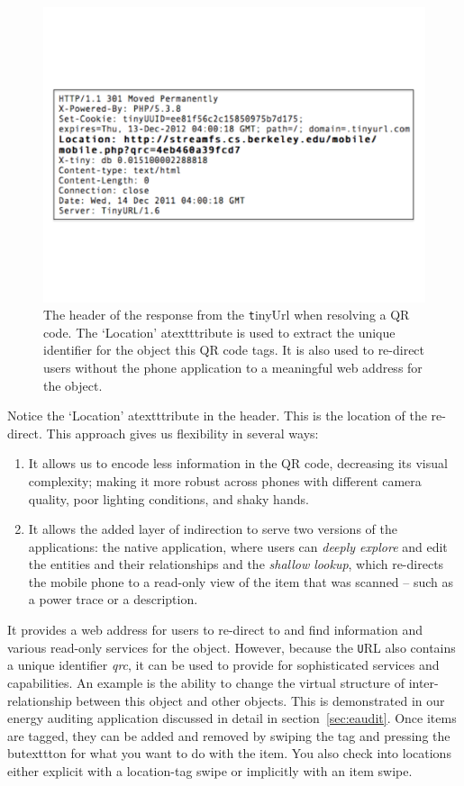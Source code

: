 \begin{figure}[htb!]
\begin{center}
\includegraphics[scale=0.30]{figs/tinyurlhdr}
\caption{The header of the response from the {\texttt tinyUrl} when resolving a QR code.  The `Location' atextttribute
is used to extract the unique identifier for the object this QR code tags.  It is also used to re-direct
users without the phone application to a meaningful web address for the object.}
\label{fig:tinyurlhdr}
\end{center}
\end{figure}


Notice the `Location' atextttribute in the header.  This is the location of the re-direct.  This approach gives us
flexibility in several ways:

\begin{enumerate}
\item It allows us to encode less information in the QR code, decreasing its visual complexity; making it more
		robust across phones with different camera quality, poor lighting conditions, and shaky hands.
\item It allows the added layer of indirection to serve two versions of the applications:  the native application,
		where users can \emph{deeply explore} and edit the entities and their relationships and the \emph{shallow lookup}, 
		which re-directs the mobile phone to a read-only view of the item that was scanned -- such as a power trace or 
		a description.
\end{enumerate}


It provides a web address for users to re-direct to and find information and various read-only services for the object.  However, because
the {\texttt URL} also contains a unique identifier \emph{qrc}, it can be used to provide for sophisticated services and capabilities.
An example is the ability to change the virtual structure of inter-relationship between this object and other objects.  This
is demonstrated in our energy auditing application discussed in detail in section~\ref{sec:eaudit}.
Once items are tagged, they can be added and removed by swiping the tag and pressing the butexttton for what you want to do with
the item.  You also check into locations either explicit with a location-tag swipe or implicitly with an item swipe.


